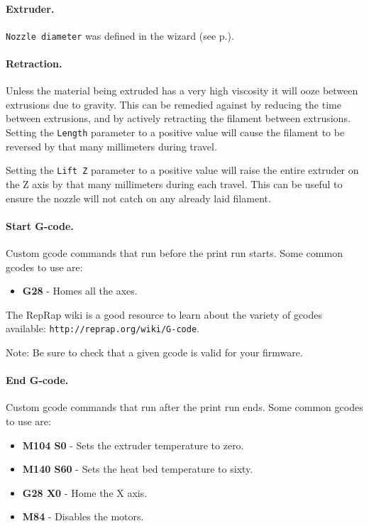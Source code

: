 \paragraph{Extruder.} %
\label{par:extruder}
\texttt{Nozzle diameter} was defined in the wizard (see p.\pageref{sub:3_nozzle_diameter}).

\paragraph{Retraction.} %
\label{par:retraction}
Unless the material being extruded has a very high viscosity it will ooze between extrusions due to gravity.  This can be remedied against by reducing the time between extrusions, and by actively retracting the filament between extrusions.  Setting the \texttt{Length} parameter to a positive value will cause the filament to be reversed by that many millimeters during travel.

Setting the \texttt{Lift Z} parameter to a positive value will raise the entire extruder on the Z axis by that many millimeters during each travel.  This can be useful to ensure the nozzle will not catch on any already laid filament.

\paragraph{Start G-code.} %
\label{par:start_g_code}
Custom gcode commands that run before the print run starts.  Some common gcodes to use are:
\begin{itemize}
	\item \textbf{G28}  - Homes all the axes.
\end{itemize}
The RepRap wiki is a good resource to learn about the variety of gcodes available: \texttt{http://reprap.org/wiki/G-code}.  

Note: Be sure to check that a given gcode is valid for your firmware.

\paragraph{End G-code.} %
\label{par:end_g_code}
Custom gcode commands that run after the print run ends.  Some common gcodes to use are:
\begin{itemize}
	\item \textbf{M104 S0}  - Sets the extruder temperature to zero.
	\item \textbf{M140 S60}  - Sets the heat bed temperature to sixty.
	\item \textbf{G28 X0} - Home the X axis.
	\item \textbf{M84}  - Disables the motors.
\end{itemize}

